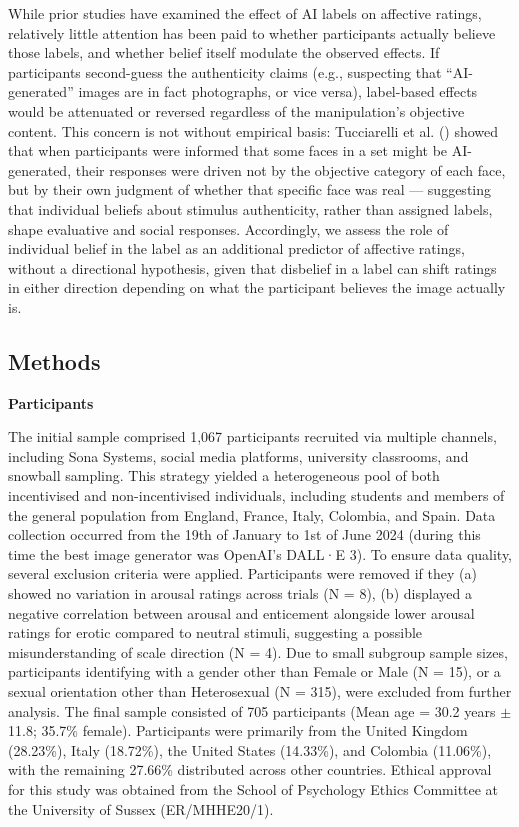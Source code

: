 \documentclass[
  jou,
  floatsintext,
  longtable,
  nolmodern,
  notxfonts,
  notimes,
  colorlinks=true,linkcolor=blue,citecolor=blue,urlcolor=blue]{apa7}
\begin{document}
While prior studies have examined the effect of AI labels on affective
ratings, relatively little attention has been paid to whether
participants actually believe those labels, and whether belief itself
modulate the observed effects. If participants second-guess the
authenticity claims (e.g., suspecting that ``AI-generated'' images are
in fact photographs, or vice versa), label-based effects would be
attenuated or reversed regardless of the manipulation's objective
content. This concern is not without empirical basis: Tucciarelli et al.
() showed that when
participants were informed that some faces in a set might be
AI-generated, their responses were driven not by the objective category
of each face, but by their own judgment of whether that specific face
was real --- suggesting that individual beliefs about stimulus
authenticity, rather than assigned labels, shape evaluative and social
responses. Accordingly, we assess the role of individual belief in the
label as an additional predictor of affective ratings, without a
directional hypothesis, given that disbelief in a label can shift
ratings in either direction depending on what the participant believes
the image actually is.

\subsection{Methods}\label{methods}

\textbf{Participants}

The initial sample comprised 1,067 participants recruited via multiple
channels, including Sona Systems, social media platforms, university
classrooms, and snowball sampling. This strategy yielded a heterogeneous
pool of both incentivised and non-incentivised individuals, including
students and members of the general population from England, France,
Italy, Colombia, and Spain. Data collection occurred from the 19th of
January to 1st of June 2024 (during this time the best image generator
was OpenAI's DALL·E 3). To ensure data quality, several exclusion
criteria were applied. Participants were removed if they (a) showed no
variation in arousal ratings across trials (N = 8), (b) displayed a
negative correlation between arousal and enticement alongside lower
arousal ratings for erotic compared to neutral stimuli, suggesting a
possible misunderstanding of scale direction (N = 4). Due to small
subgroup sample sizes, participants identifying with a gender other than
Female or Male (N = 15), or a sexual orientation other than Heterosexual
(N = 315), were excluded from further analysis. The final sample
consisted of 705 participants (Mean age = 30.2 years \(\pm\) 11.8;
35.7\% female). Participants were primarily from the United Kingdom
(28.23\%), Italy (18.72\%), the United States (14.33\%), and Colombia
(11.06\%), with the remaining 27.66\% distributed across other
countries. Ethical approval for this study was obtained from the School
of Psychology Ethics Committee at the University of Sussex
(ER/MHHE20/1).
\end{document}
